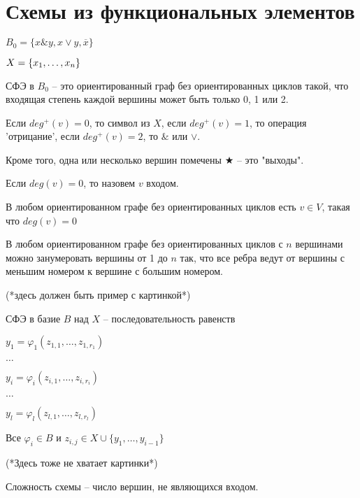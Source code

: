 \section{Схемы из функциональных элементов}

$B_0 = \{x \& y, x \vee y, \overline{x}\}$  

$X = \{x_1, \ldots, x_n\}$

СФЭ в $B_0$ -- это ориентированный граф без ориентированных циклов такой, что входящая степень каждой вершины может быть только 0, 1 или 2.

Если $deg^{+}(v) = 0$, то символ из $X$, если $deg^{+}(v) = 1$, то операция 'отрицание', если $deg^{+}(v) = 2$, то $\&$ или $\vee$.

Кроме того, одна или несколько вершин помечены $\bigstar$  -- это "выходы".

Если $deg(v) = 0$, то назовем $v$ входом.

\begin{stm}
	В любом ориентированном графе без ориентированных циклов есть $v \in V$, такая что $deg(v) = 0$
\end{stm}

\begin{stm}
	В любом ориентированном графе без ориентированных циклов с $n$ вершинами можно занумеровать вершины от 1 до $n$ так, что все ребра ведут от вершины с меньшим номером к вершине с большим номером.
\end{stm}

(*здесь должен быть пример с картинкой*)


СФЭ в базие $B$ над $X$ -- последовательность равенств

$y_1 = \varphi_1(z_{1,1}, \ldots, z_{1,r_1})$ 

$ \ldots$

$y_i = \varphi_i(z_{i,1}, \ldots, z_{i,r_i})$ 

$\ldots$

$ y_l = \varphi_l(z_{l,1}, \ldots, z_{l,r_l})$

Все $\varphi_i \in B$ и $z_{i,j} \in X \cup \{y_1, \ldots, y_{i - 1}\}$

(*Здесь тоже не хватает картинки*)

\begin{df}
	Сложность схемы -- число вершин, не являющихся входом.
\end{df}
